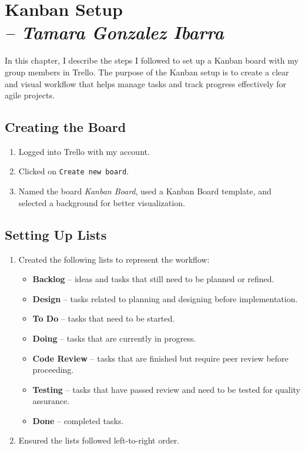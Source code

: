 \chapter{Kanban Setup \\
\small{\textit{-- Tamara Gonzalez Ibarra}}
}
\label{Chapter::KanbanSetup}

In this chapter, I describe the steps I followed to set up a Kanban board with my group members in Trello. 
The purpose of the Kanban setup is to create a clear and visual workflow that helps manage tasks and track progress effectively for agile projects. 

\section{Creating the Board}
\begin{enumerate}
    \item Logged into Trello with my account.
    \item Clicked on \texttt{Create new board}.
    \item Named the board \textit{Kanban Board}, used a Kanban Board template, and selected a background for better visualization.
\end{enumerate}

\section{Setting Up Lists}
\begin{enumerate}
    \item Created the following lists to represent the workflow:
    \begin{itemize}
        \item \textbf{Backlog} – ideas and tasks that still need to be planned or refined.
        \item \textbf{Design} – tasks related to planning and designing before implementation.
        \item \textbf{To Do} – tasks that need to be started.
        \item \textbf{Doing} – tasks that are currently in progress.
        \item \textbf{Code Review} – tasks that are finished but require peer review before proceeding.
        \item \textbf{Testing} – tasks that have passed review and need to be tested for quality assurance.
        \item \textbf{Done} – completed tasks.
        
    \end{itemize}
    \item Ensured the lists followed left-to-right order.
\end{enumerate}


